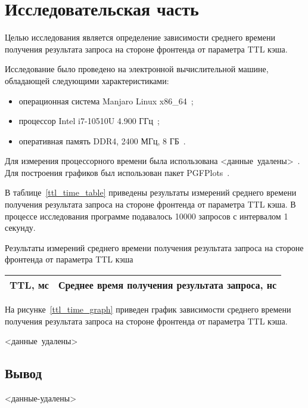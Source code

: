 \chapter{Исследовательская часть}

Целью исследования является определение зависимости среднего времени получения результата запроса на стороне фронтенда от параметра TTL кэша.

Исследование было проведено на электронной вычислительной машине, обладающей следующими характеристиками:
\begin{itemize}
	\item операционная система Manjaro Linux x86\_64~\cite{manjaro};
	\item процессор Intel i7-10510U 4.900 ГГц~\cite{cpu};
	\item оперативная память DDR4, 2400 МГц, 8 ГБ~\cite{ram}.
\end{itemize}

Для измерения процессорного времени была использована <данные~удалены>~\cite{}. Для построения графиков был использован пакет PGFPlots~\cite{pgfplots}.

В таблице~\ref{ttl_time_table} приведены результаты измерений среднего времени получения результата запроса на стороне фронтенда от параметра TTL кэша. В процессе исследования программе подавалось 10000 запросов с интервалом 1 секунду.
\begin{center}
	\begin{threeparttable}
		\captionsetup{justification=raggedright,singlelinecheck=off}
		\caption{\label{ttl_time_table}Результаты измерений среднего времени получения результата запроса на стороне фронтенда от параметра TTL кэша}
		\centering
		\begin{tabular}{|c|c|}
			\hline
			TTL, мс & Среднее время получения результата запроса, нс \\
			\hline
		\end{tabular}
	\end{threeparttable}
\end{center}

На рисунке~\ref{ttl_time_graph} приведен график зависимости среднего времени получения результата запроса на стороне фронтенда от параметра TTL кэша.

<данные~удалены>

\section{Вывод}

<данные-удалены>

\clearpage
